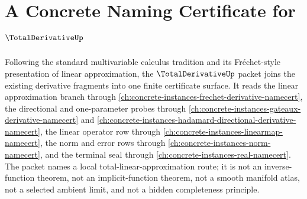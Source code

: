\chapter{A Concrete Naming Certificate for $\TotalDerivativeUp$}
\label{ch:concrete-instances-total-derivative-namecert}

Following the standard multivariable calculus tradition and its Fréchet-style presentation of linear approximation, the $\TotalDerivativeUp$ packet joins the existing derivative fragments into one finite certificate surface. It reads the linear approximation branch through \autoref{ch:concrete-instances-frechet-derivative-namecert}, the directional and one-parameter probes through \autoref{ch:concrete-instances-gateaux-derivative-namecert} and \autoref{ch:concrete-instances-hadamard-directional-derivative-namecert}, the linear operator row through \autoref{ch:concrete-instances-linearmap-namecert}, the norm and error rows through \autoref{ch:concrete-instances-norm-namecert}, and the terminal seal through \autoref{ch:concrete-instances-real-namecert}. The packet names a local total-linear-approximation route; it is not an inverse-function theorem, not an implicit-function theorem, not a smooth manifold atlas, not a selected ambient limit, and not a hidden completeness principle.

